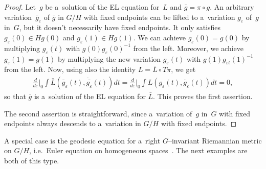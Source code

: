 \documentclass[pdftex]{sigma}
\numberwithin{equation}{section}
\begin{document}
\begin{proof}
Let~$g$ be a~solution of the EL equation for~$L$ and $\bar g=\pi\circ g$.
An arbitrary varia\-tion~$\bar g_\varepsilon$ of $\bar g$ in $G/H$ with f\/ixed endpoints can be lifted to a~variation
$g_\varepsilon$ of~$g$ in~$G$, but it doesn't necessarily have f\/ixed endpoints.
It only satisf\/ies $g_\varepsilon(0)\in Hg(0)$ and $g_\varepsilon(1)\in Hg(1)$.
We can achieve $g_\varepsilon(0)=g(0)$ by multiplying $g_\varepsilon(t)$ with $g(0)g_\varepsilon(0)^{-1}$ from the left.
Moreover, we achieve $g_\varepsilon(1)=g(1)$ by multiplying the new variation $g_\varepsilon(t)$ with
$g(1)g_{\varepsilon t}(1)^{-1}$ from the left.
Now, using also the identity $L=\bar L\circ T\pi$, we get
\begin{gather*}
\frac{d}{d\varepsilon}\Big|_0\int\bar L(\bar g_\varepsilon(t),\dot{\bar {g_\varepsilon}}(t))dt
=\frac{d}{d\varepsilon}\Big|_0\int L(g_\varepsilon(t),\dot{g_\varepsilon}(t))dt =0,
\end{gather*}
so that $\bar g$ is a~solution of the EL equation for $\bar L$.
This proves the f\/irst assertion.

The second assertion is straightforward, since a~variation of~$g$ in~$G$ with f\/ixed endpoints always descends to
a~variation in $G/H$ with f\/ixed endpoints.
\end{proof}

A special case is the geodesic equation for a~right $G$--invariant Riemannian metric on $G/H$, i.e.\ Euler equation on
homogeneous spaces~\cite{KM}.
The next examples are both of this type.
\end{document}
